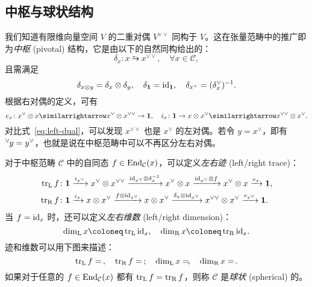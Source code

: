 \subsection{中枢与球状结构}

我们知道有限维向量空间 $V$ 的二重对偶 $V^{\vee\vee}$ 同构于 $V$。这在张量范畴中的推广即为\emph{中枢} (pivotal) 结构，它是由以下的自然同构给出的：
\begin{equation}
  \delta_x \colon x \similarrightarrow x^{\vee\vee}, \quad \forall x\in\mathcal{C},
\end{equation}
且需满足
\begin{equation}
  \delta_{x\otimes y} = \delta_x\otimes\delta_y, \quad
  \delta_{\mathbf{1}} = \mathrm{id}_{\mathbf{1}}, \quad
  \delta_{x^\vee} = (\delta_x^\vee)^{-1}.
\end{equation}
根据右对偶的定义，可有
\begin{equation}
  e_x\colon x^\vee\otimes x \similarrightarrow x^\vee\otimes x^{\vee\vee}\to\1, \quad
  i_x\colon \1\to x\otimes x^\vee \similarrightarrow x^{\vee\vee}\otimes x^\vee.
\end{equation}
对比式~\eqref{eq:left-dual}，可以发现 $x^{\vee\vee}$ 也是 $x^\vee$ 的左对偶。若令 $y=x^\vee$，即有 ${}^\vee\mspace{-2mu}y=y^\vee$，也就是说在中枢范畴中可以不再区分左右对偶。

对于中枢范畴 $\mathcal{C}$ 中的自同态 $f\in\operatorname{End}_{\mathcal{C}}(x)$，可以定义\emph{左右迹} (left/right trace)：
\begin{equation}
  \begin{aligned}
    \operatorname{tr}_{\text{L}} f &\colon \mathbf{1} \xrightarrow{i_{x^\vee}} x^\vee\otimes x^{\vee\vee}
                                \xrightarrow{\mathrm{id}_{x^\vee}\otimes\delta_x^{-1}} x^\vee\otimes x
                                \xrightarrow{\mathrm{id}_{x^\vee}\otimes f} x^\vee\otimes x
                                \xrightarrow{e_x} \mathbf{1}, \\
    \operatorname{tr}_{\text{R}} f &\colon \mathbf{1} \xrightarrow{i_x} x\otimes x^\vee
                                \xrightarrow{f\otimes\mathrm{id}_{x^\vee}} x\otimes x^\vee
                                \xrightarrow{\delta_x\otimes\mathrm{id}_{x^\vee}} x^{\vee\vee}\otimes x^\vee
                                \xrightarrow{e_{x^\vee}} \mathbf{1}.
  \end{aligned}
\end{equation}
当 $f=\mathrm{id}_x$ 时，还可以定义\emph{左右维数} (left/right dimension)：
\begin{equation}
  \dim_{\text{L}} x \coloneq \tr_{\text{L}}\id_x, \quad
  \dim_{\text{R}} x \coloneq \tr_{\text{R}}\id_x.
  \label{eq:left-right-dimension}
\end{equation}
迹和维数可以用下图来描述：
\begin{equation}
  \operatorname{tr}_{\text{L}}  f =  \, , \quad
  \operatorname{tr}_{\text{R}}  f =  \, ; \quad
  \dim_{\text{L}} x =  \!, \quad
  \dim_{\text{R}} x =  \!.
\end{equation}
如果对于任意的 $f\in\operatorname{End}_{\mathcal{C}}(x)$ 都有 $\operatorname{tr}_{\text{L}}f=\operatorname{tr}_{\text{R}}f$，则称 $\mathcal{C}$ 是\emph{球状} (spherical) 的。

